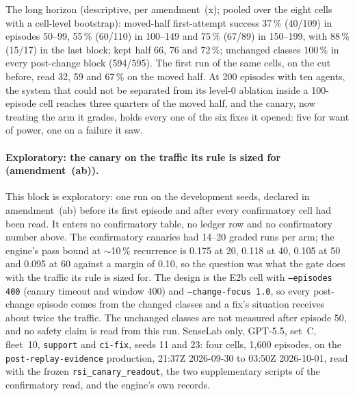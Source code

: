 \documentclass[11pt]{article}
\newcommand{\code}[1]{\texttt{#1}}
\begin{document}
The long horizon (descriptive, per amendment~(x); pooled over the eight cells with a cell-level
bootstrap): moved-half first-attempt success 37\,\% (40/109) in episodes 50--99, 55\,\%
(60/110) in 100--149 and 75\,\% (67/89) in 150--199, with 88\,\% (15/17) in the last block; kept
half 66, 76 and 72\,\%; unchanged classes 100\,\% in every post-change block (594/595). The
first run of the same cells, on the cut before, read 32, 59 and 67\,\% on the moved half. At 200
episodes with ten agents, the system that could not be separated from its level-0 ablation
inside a 100-episode cell reaches three quarters of the moved half, and the canary, now treating
the arm it grades, holds every one of the six fixes it opened: five for want of power, one on a
failure it saw.

\paragraph{Exploratory: the canary on the traffic its rule is sized for (amendment~(ab)).}
\label{par:exploratory-canary}
This block is exploratory: one run on the development seeds, declared in amendment~(ab) before
its first episode and after every confirmatory cell had been read. It enters no confirmatory
table, no ledger row and no confirmatory number above. The confirmatory canaries had 14--20
graded runs per arm; the engine's pass bound at $\sim$10\,\% recurrence is 0.175 at 20, 0.118
at 40, 0.105 at 50 and 0.095 at 60 against a margin of 0.10, so the question was what the gate
does with the traffic its rule is sized for. The design is the E2b cell with \code{--episodes
400} (canary timeout and window 400) and \code{--change-focus 1.0}, so every post-change episode
comes from the changed classes and a fix's situation receives about twice the traffic. The
unchanged classes are not measured after episode 50, and no safety claim is read from this run.
SenseLab only, GPT-5.5, set~C, fleet~10, \code{support} and \code{ci-fix}, seeds 11 and 23: four
cells, 1,600 episodes, on the \code{post-replay-evidence} production, 21:37Z 2026-09-30 to
03:50Z 2026-10-01, read with the frozen \code{rsi\_canary\_readout}, the two supplementary
scripts of the confirmatory read, and the engine's own records.
\end{document}
